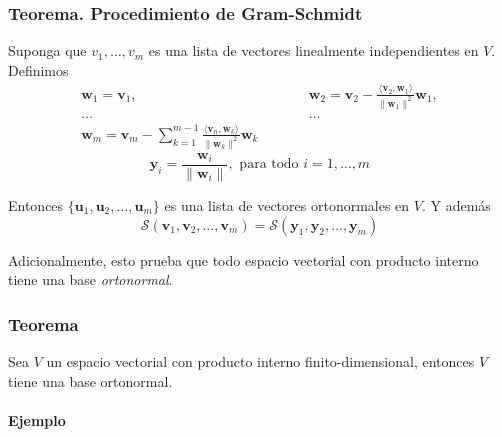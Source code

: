 \documentclass[
]{article}
\begin{document}
\hypertarget{teorema.-procedimiento-de-gram-schmidt}{%
\subsubsection{Teorema. Procedimiento de
Gram-Schmidt}\label{teorema.-procedimiento-de-gram-schmidt}}

Suponga que \(v_1,\ldots,v_m\) es una lista de vectores linealmente
independientes en \(V\). Definimos \[
\begin{matrix}
\mathbf{w}_1=\mathbf{v}_1, &\quad\quad & \mathbf{w}_2=\mathbf{v}_2 - \frac{\langle \mathbf{v}_2, \mathbf{w}_1 \rangle}{\|\mathbf{w}_1\|^2}\mathbf{w}_1, \\
 \ldots & \quad\quad & \ldots  \\
\mathbf{w}_m= \mathbf{v}_m - \sum_{k=1}^{m-1}\frac{\langle\mathbf{v}_n, \mathbf{w}_k\rangle}{\|\mathbf{w}_k\|^2}\mathbf{w}_{k}
\end{matrix}
\] \begin{equation}
  \mathbf{y}_i=\frac{\mathbf{w}_i}{\|\mathbf{w}_i\|},\mbox{ para todo }i=1,\ldots,m
\end{equation}

Entonces \(\{\mathbf{u}_1,\mathbf{u}_2,\ldots, \mathbf{u}_m\}\) es una
lista de vectores ortonormales en \(V\). Y además \[
\mathcal{S}(\mathbf{v}_1,\mathbf{v}_2,\ldots, \mathbf{v}_m) = \mathcal{S}(\mathbf{y}_1,\mathbf{y}_2,\ldots, \mathbf{y}_m)
\]

Adicionalmente, esto prueba que todo espacio vectorial con producto
interno tiene una base \emph{ortonormal}.

\hypertarget{teorema}{%
\subsubsection{Teorema}\label{teorema}}

Sea \(V\) un espacio vectorial con producto interno finito-dimensional,
entonces \(V\) tiene una base ortonormal.

\hypertarget{ejemplo}{%
\paragraph{Ejemplo}\label{ejemplo}}
\end{document}
